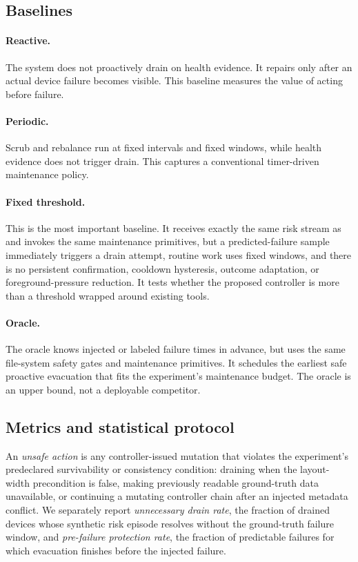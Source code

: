 \subsection{Baselines}


\paragraph{Reactive.} The system does not proactively drain on health evidence. It repairs only after an actual device failure becomes visible. This baseline measures the value of acting before failure.

\paragraph{Periodic.} Scrub and rebalance run at fixed intervals and fixed windows, while health evidence does not trigger drain. This captures a conventional timer-driven maintenance policy.

\paragraph{Fixed threshold.} This is the most important baseline. It receives exactly the same risk stream as \autopilot{} and invokes the same maintenance primitives, but a predicted-failure sample immediately triggers a drain attempt, routine work uses fixed windows, and there is no persistent confirmation, cooldown hysteresis, outcome adaptation, or foreground-pressure reduction. It tests whether the proposed controller is more than a threshold wrapped around existing tools.

\paragraph{Oracle.} The oracle knows injected or labeled failure times in advance, but uses the same file-system safety gates and maintenance primitives. It schedules the earliest safe proactive evacuation that fits the experiment's maintenance budget. The oracle is an upper bound, not a deployable competitor.

\subsection{Metrics and statistical protocol}
An \emph{unsafe action} is any controller-issued mutation that violates the experiment's predeclared survivability or consistency condition: draining when the layout-width precondition is false, making previously readable ground-truth data unavailable, or continuing a mutating controller chain after an injected metadata conflict. We separately report \emph{unnecessary drain rate}, the fraction of drained devices whose synthetic risk episode resolves without the ground-truth failure window, and \emph{pre-failure protection rate}, the fraction of predictable failures for which evacuation finishes before the injected failure.

